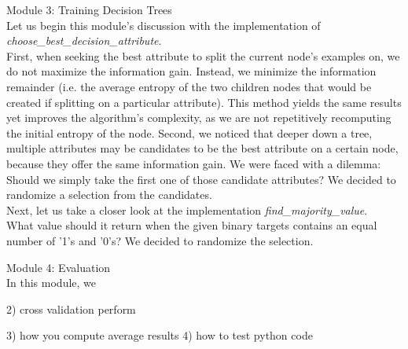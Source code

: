 Module 3: Training Decision Trees \\
Let us begin this module's discussion with the implementation of \emph{choose\_best\_decision\_attribute}. \\
First, when seeking the best attribute to split the current node's examples on, we do not maximize the information gain.
Instead, we minimize the information remainder (i.e. the average entropy of the two children nodes
that would be created if splitting on a particular attribute).
This method yields the same results yet improves the algorithm's complexity,
as we are not repetitively recomputing the initial entropy of the node.
Second, we noticed that deeper down a tree, multiple attributes may be candidates to be the best attribute on a certain node,
because they offer the same information gain. We were faced with a dilemma: Should we simply
take the first one of those candidate attributes? We decided to randomize a selection from the candidates.\\
Next, let us take a closer look at the implementation \emph{find\_majority\_value}.\\
What value should it return when the given binary targets contains an equal number of
'1's and '0's? We decided to randomize the selection.


Module 4: Evaluation \\
In this module, we 

2) cross validation perform



3) how you compute average results
4) how to test python code

